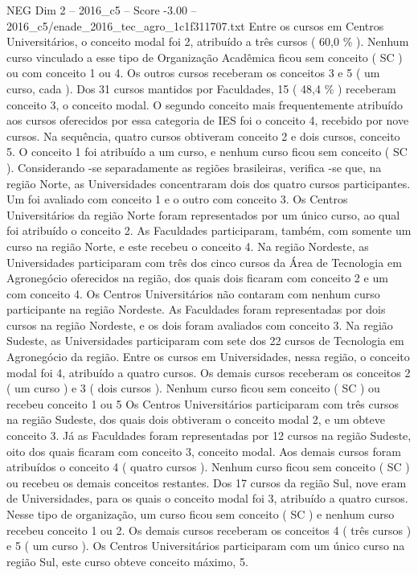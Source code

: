 \begin{textsample}{NEG Dim 2 – 2016\_c5 – Score -3.00 – 2016\_c5/enade\_2016\_tec\_agro\_1c1f311707.txt}
Entre os cursos em Centros Universitários, o conceito modal foi 2, atribuído a três cursos ( 60,0 \% ).
Nenhum curso vinculado a esse tipo de Organização Acadêmica ficou sem conceito ( SC ) ou com conceito 1 ou 4.
Os outros cursos receberam os conceitos 3 e 5 ( um curso, cada ).
Dos 31 cursos mantidos por Faculdades, 15 ( 48,4 \% ) receberam conceito 3, o conceito modal.
O segundo conceito mais frequentemente atribuído aos cursos oferecidos por essa categoria de IES foi o conceito 4, recebido por nove cursos.
Na sequência, quatro cursos obtiveram conceito 2 e dois cursos, conceito 5.
O conceito 1 foi atribuído a um curso, e nenhum curso ficou sem conceito ( SC ).
Considerando -se separadamente as regiões brasileiras, verifica -se que, na região Norte, as Universidades concentraram dois dos quatro cursos participantes.
Um foi avaliado com conceito 1 e o outro com conceito 3.
Os Centros Universitários da região Norte foram representados por um único curso, ao qual foi atribuído o conceito 2.
As Faculdades participaram, também, com somente um curso na região Norte, e este recebeu o conceito 4.
Na região Nordeste, as Universidades participaram com três dos cinco cursos da Área de Tecnologia em Agronegócio oferecidos na região, dos quais dois ficaram com conceito 2 e um com conceito 4.
Os Centros Universitários não contaram com nenhum curso participante na região Nordeste.
As Faculdades foram representadas por dois cursos na região Nordeste, e os dois foram avaliados com conceito 3.
Na região Sudeste, as Universidades participaram com sete dos 22 cursos de Tecnologia em Agronegócio da região.
Entre os cursos em Universidades, nessa região, o conceito modal foi 4, atribuído a quatro cursos.
Os demais cursos receberam os conceitos 2 ( um curso ) e 3 ( dois cursos ).
Nenhum curso ficou sem conceito ( SC ) ou recebeu conceito 1 ou 5 Os Centros Universitários participaram com três cursos na região Sudeste, dos quais dois obtiveram o conceito modal 2, e um obteve conceito 3.
Já as Faculdades foram representadas por 12 cursos na região Sudeste, oito dos quais ficaram com conceito 3, conceito modal.
Aos demais cursos foram atribuídos o conceito 4 ( quatro cursos ).
Nenhum curso ficou sem conceito ( SC ) ou recebeu os demais conceitos restantes.
Dos 17 cursos da região Sul, nove eram de Universidades, para os quais o conceito modal foi 3, atribuído a quatro cursos.
Nesse tipo de organização, um curso ficou sem conceito ( SC ) e nenhum curso recebeu conceito 1 ou 2.
Os demais cursos receberam os conceitos 4 ( três cursos ) e 5 ( um curso ).
Os Centros Universitários participaram com um único curso na região Sul, este curso obteve conceito máximo, 5.

\end{textsample}
